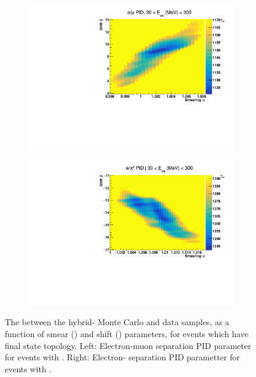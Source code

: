\begin{figure}[h]
  \begin{subfigure}[t]{0.49\textwidth}
    \includegraphics[width=\textwidth, trim={0mm 0mm 0mm 0mm}, clip,page=1]{Figures/Selections/EMUPID_Elt300_Chi2Map.pdf}
  \end{subfigure}%
  \begin{subfigure}[t]{0.49\textwidth}
    \includegraphics[width=\textwidth, trim={0mm 0mm 0mm 0mm}, clip,page=1]{Figures/Selections/EPI0PID_Elt300_Chi2Map.pdf}
  \end{subfigure}
  \caption{The  between the hybrid- Monte Carlo and data samples, as a function of smear (\quickmath{\alpha}) and shift (\quickmath{\beta}) parameters, for events which have  final state topology. Left: Electron-muon separation PID parameter for events with . Right: Electron- separation PID parametter for events with .}
  \label{fig:SelsAndSysts_HybridChi2Maps}
\end{figure}

